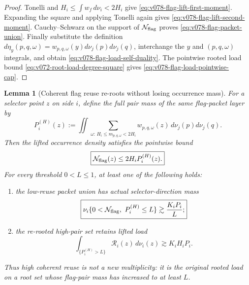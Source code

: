 \documentclass[10pt]{article}
\newtheorem{lemma}[theorem]{Lemma}
\begin{document}
\begin{proof}
Tonelli and \(H_i\le\int w_f\,d\nu_i<2H_i\) give
\eqref{eq:v078-flag-lift-first-moment}.  Expanding the square and applying Tonelli again gives
\eqref{eq:v078-flag-lift-second-moment}.  Cauchy--Schwarz on the support of
\(\mathcal N_{\rm flag}\) proves \eqref{eq:v078-flag-packet-union}.  Finally substitute the
definition
\(d\eta_y(p,q,\omega)=w_{p,q,\omega}(y)d\nu_j(p)d\nu_j(q)\), interchange the \(y\) and
\((p,q,\omega)\) integrals, and obtain \eqref{eq:v078-flag-load-self-duality}.  The pointwise rooted
load bound \eqref{eq:v072-root-load-degree-square} gives
\eqref{eq:v078-flag-load-pointwise-cap}.
\end{proof}

\begin{lemma}[Coherent flag reuse re-roots without losing occurrence mass]
\label{lem:v078-coherent-flag-rerooting}
For a selector point \(z\) on side \(i\), define the full pair mass of the same flag-packet layer by
\begin{equation}
\label{eq:v078-rerooted-flag-pair-mass}
P_i^{(H)}(z)
:=
\iint\sum_{\omega:\,H_i\le m_{p,q,\omega}<2H_i}
w_{p,q,\omega}(z)
\,d\nu_j(p)d\nu_j(q).
\end{equation}
Then the lifted occurrence density satisfies the pointwise bound
\begin{equation}
\label{eq:v078-flag-density-by-rerooted-pair-mass}
\boxed{
\mathcal N_{\rm flag}(z)
\le
2H_iP_i^{(H)}(z).
}
\end{equation}
For every threshold \(0<L\le1\), at least one of the following holds:
\begin{enumerate}[label=\textnormal{(\roman*)}]
\item the low-reuse packet union has actual selector-direction mass
\begin{equation}
\label{eq:v078-low-flag-reuse-union}
\boxed{
\nu_i\{0<\mathcal N_{\rm flag},\ P_i^{(H)}\le L\}
\gtrsim
\frac{K_iP_i}{L};
}
\end{equation}
\item the re-rooted high-pair set retains lifted load
\begin{equation}
\label{eq:v078-high-flag-rerooted-load}
\boxed{
\int_{\{P_i^{(H)}>L\}}
\mathcal R_i(z)\,d\nu_i(z)
\gtrsim
K_iH_iP_i.
}
\end{equation}
\end{enumerate}
Thus high coherent reuse is not a new multiplicity: it is the original rooted load on a root set
whose flag-pair mass has increased to at least \(L\).
\end{lemma}
\end{document}

